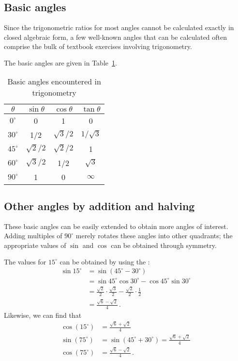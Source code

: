 \documentclass[12pt]{article}
\begin{document}
\subsection{Basic angles}

Since the trigonometric ratios for most angles cannot be
calculated exactly in closed algebraic form,
a few well-known angles 
that can be calculated
often comprise the bulk of textbook
exercises involving trigonometry.  

The basic angles are given in Table~\ref{table: basic angles}.

\begin{table}
\caption{Basic angles encountered in trigonometry}
\label{table: basic angles}
\begin{tabular}{| c | c | c | c |}
\hline
$\theta$ &$\sin \theta $ &$\cos \theta$ &$\tan \theta $\\
\hline
$0^\circ$ &0 &1 &0 \\
$30^\circ$ &1/2 &$\sqrt{3}/2$ &$1/\sqrt{3}$ \\
$45^\circ$ &$\sqrt{2}/2$ &$\sqrt{2}/2$ &1 \\
$60^\circ$ &$\sqrt{3}/2$ &1/2 &$\sqrt{3}$ \\
$90^\circ$ &1 &0 & $\infty$ \\
\hline
\end{tabular}
\end{table}

\subsection{Other angles by addition and halving}

These basic angles can be easily extended to obtain more angles of interest.  Adding multiples of $90^\circ$ merely rotates these angles into other quadrants; the appropriate values of $\sin$ and $\cos$ can be obtained through symmetry.

The values for $15^\circ$ can be obtained by using the :
\begin{align*}
\sin 15^\circ &=\sin(45^\circ-30^\circ)\\
  &=\sin 45^\circ \cos 30^\circ -\cos 45^\circ \sin 30^\circ  \\
  &=\frac{\sqrt{2}}{2} \cdot \frac{\sqrt{3}}{2} - \frac{\sqrt{2}}{2} \cdot \frac{1}{2} \\
  &=\frac{\sqrt{6}-\sqrt{2}}{4}\,.
\end{align*}
Likewise, we can find that 
\begin{align*}
\cos(15^\circ) &=\frac{\sqrt{6}+\sqrt{2}}{4} \\
\sin(75^\circ) &= \sin(45^\circ+30^\circ)=\frac{\sqrt{6}+\sqrt{2}}{4} \\
\cos(75^\circ) &= \frac{\sqrt{6}-\sqrt{2}}{4}\,.
\end{align*}
\end{document}
